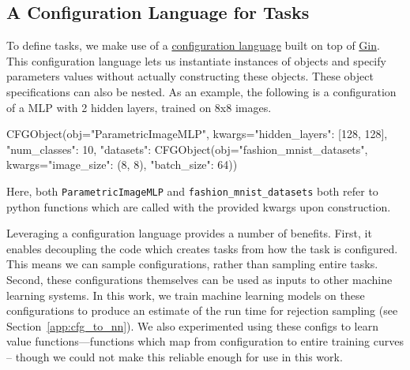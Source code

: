 \documentclass[11pt]{article}
\begin{document}
\subsection{A Configuration Language for Tasks} \label{app:config}
To define tasks, we make use of a \href{https://github.com/google/learned_optimization/blob/4447601601f04e3dc7b1aecd7854d44526593752/learned_optimization/tasks/parametric/cfgobject.py}{configuration language} built on top of \href{https://github.com/google/gin-config}{Gin}.
This configuration language lets us instantiate instances of objects and specify parameters values without actually constructing these objects.
These object specifications can also be nested.
As an example, the following is a configuration of a MLP with 2 hidden layers, trained on 8x8 images.
\begin{python}
CFGObject(obj="ParametricImageMLP",
  kwargs={"hidden_layers": [128, 128],
          "num_classes": 10,
          "datasets": CFGObject(obj="fashion_mnist_datasets",
                      kwargs={"image_size": (8, 8), "batch_size": 64})})
\end{python}

Here, both \texttt{ParametricImageMLP} and \texttt{fashion\_mnist\_datasets} both refer to python functions which are called with the provided kwargs upon construction.

Leveraging a configuration language provides a number of benefits.
First, it enables decoupling the code which creates tasks from how the task is configured.
This means we can sample configurations, rather than sampling entire tasks.
Second, these configurations themselves can be used as inputs to other machine learning systems.
In this work, we train machine learning models on these configurations to produce an estimate of the run time for rejection sampling (see Section~\ref{app:cfg_to_nn}).
We also experimented using these configs to learn value functions---functions which map from configuration to entire training curves -- though we could not make this reliable enough for use in this work. 
\end{document}
